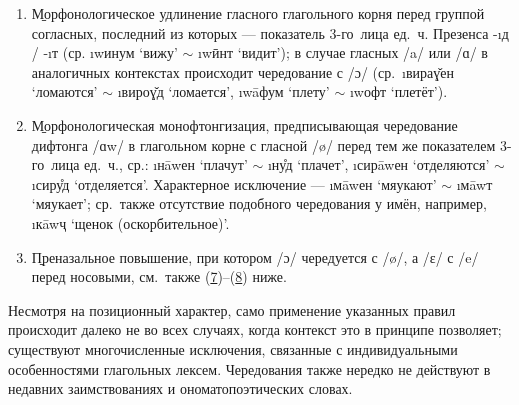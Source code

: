 \begin{enumerate}[(1)]
	\item \label{exmorphon1} \b{Морфонологическое удлинение} гласного глагольного корня перед группой согласных, последний из которых — показатель 3-го~лица ед.~ч. Презенса -\i{д} / -\i{т} (ср. \i{wинум} ‘вижу’ $\sim$ \i{wӣнт} ‘видит’); в случае гласных /a/ или /ɑ/ в аналогичных контекстах происходит чередование с /ɔ/ (ср.~\i{вираɣ̌ен} ‘ломаются’ $\sim$ \i{вироɣ̌д} ‘ломается’, \i{wāфум} ‘плету’ $\sim$ \i{wофт} ‘плетёт’).
	\item \label{exmorphon2} \b{Морфонологическая монофтонгизация}, предписывающая чередование дифтонга /ɑw/ в глагольном корне с гласной /ø/ перед тем же показателем 3-го~лица ед.~ч., ср.: \i{нāwен} ‘плачут’ $\sim$ \i{ну̊д} ‘плачет’, \i{сирāwен} ‘отделяются’ $\sim$ \i{сиру̊д} ‘отделяется’. Характерное исключение — \i{мāwен} ‘мяукают’ $\sim$ \i{мāwт} ‘мяукает’; ср.~также отсутствие подобного чередования у имён, например, \i{кāwҷ} ‘щенок (оскорбительное)’.
	\item \label{exmorphon3} \b{Преназальное повышение}, при котором /ɔ/ чередуется с /ø/, а /ɛ/ с /e/ перед носовыми, см.~также (\hyperref[exmorphon7]{7})–(\hyperref[exmorphon8]{8}) ниже.
\end{enumerate}

Несмотря на позиционный характер, само применение указанных правил происходит далеко не во всех случаях, когда контекст это в принципе позволяет; существуют многочисленные исключения, связанные с индивидуальными особенностями глагольных лексем. Чередования также нередко не действуют в недавних заимствованиях и ономатопоэтических словах.

